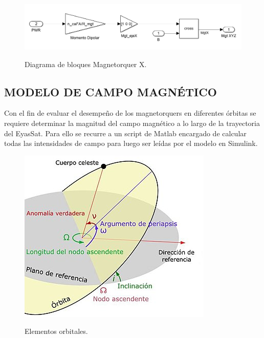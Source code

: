 
\begin{figure}[h]
	\begin{center}
		\includegraphics[scale=0.4]{imagenes/modelo_dinamico/bloquesMgt.PNG}\\
	\end{center}
	\caption{Diagrama de bloques Magnetorquer X.}
	\label{fig:bloquesMgt}
	\textit{}
\end{figure}


\subsection{MODELO DE CAMPO MAGNÉTICO}

Con el fin de evaluar el desempeño de los magnetorquers en diferentes órbitas se requiere determinar la magnitud del campo magnético a lo largo de la trayectoria del EyasSat. Para ello se recurre a un script de Matlab encargado de calcular todas las intensidades de campo para luego ser leídas por el modelo en Simulink.

\begin{figure}[!ht]
	\begin{center}
		\includegraphics[scale=0.6]{imagenes/modelo_dinamico/Elementos_orbitales.jpg}\\
	\end{center}
	\caption{Elementos orbitales.}
	\label{fig:elementosOrbitales}
	\textit{}
\end{figure}
	 
